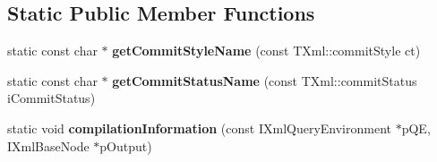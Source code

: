 \subsection*{\-Static \-Public \-Member \-Functions}
\begin{DoxyCompactItemize}
\item 
\hypertarget{classgeneral__server_1_1TXmlProcessor_aa5bf23e8f36b2f466ee0a9e73305220c}{static const char $\ast$ {\bfseries get\-Commit\-Style\-Name} (const \-T\-Xml\-::commit\-Style ct)}\label{classgeneral__server_1_1TXmlProcessor_aa5bf23e8f36b2f466ee0a9e73305220c}

\item 
\hypertarget{classgeneral__server_1_1TXmlProcessor_a460a3445d1dd60095ccfa9480ebb3516}{static const char $\ast$ {\bfseries get\-Commit\-Status\-Name} (const \-T\-Xml\-::commit\-Status i\-Commit\-Status)}\label{classgeneral__server_1_1TXmlProcessor_a460a3445d1dd60095ccfa9480ebb3516}

\item 
\hypertarget{classgeneral__server_1_1TXmlProcessor_a670e3626e20ce601d911fd88562aa942}{static void {\bfseries compilation\-Information} (const \-I\-Xml\-Query\-Environment $\ast$p\-Q\-E, \-I\-Xml\-Base\-Node $\ast$p\-Output)}\label{classgeneral__server_1_1TXmlProcessor_a670e3626e20ce601d911fd88562aa942}

\end{DoxyCompactItemize}
